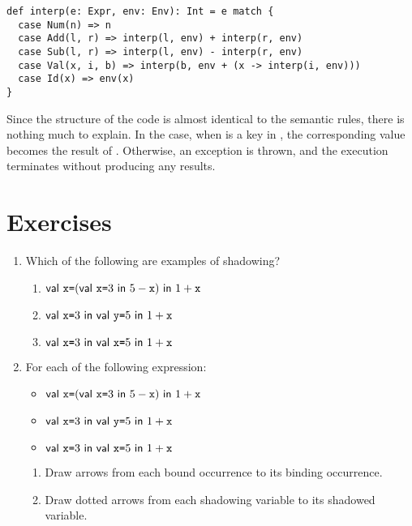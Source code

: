 \begin{verbatim}
def interp(e: Expr, env: Env): Int = e match {
  case Num(n) => n
  case Add(l, r) => interp(l, env) + interp(r, env)
  case Sub(l, r) => interp(l, env) - interp(r, env)
  case Val(x, i, b) => interp(b, env + (x -> interp(i, env)))
  case Id(x) => env(x)
}
\end{verbatim}

Since the structure of the code is almost identical to the semantic rules, there
is nothing much to explain. In the  case, when  is a key in
, the corresponding value becomes the result of .
Otherwise, an exception is thrown, and the execution
terminates without producing any results.

\section{Exercises}

\begin{enumerate}
\item Which of the following are examples of shadowing?
\begin{enumerate}
  \item $\textsf{val}\ \texttt{x}\texttt{=}(\textsf{val}\ \texttt{x}\texttt{=}3\ \textsf{in}\ 5-\texttt{x})\ \textsf{in}\ 1+\texttt{x}$
  \item $\textsf{val}\ \texttt{x}\texttt{=}3\ \textsf{in}\ \textsf{val}\ \texttt{y}\texttt{=}5\ \textsf{in}\ 1+\texttt{x}$
  \item $\textsf{val}\ \texttt{x}\texttt{=}3\ \textsf{in}\ \textsf{val}\ \texttt{x}\texttt{=}5\ \textsf{in}\ 1+\texttt{x}$
\end{enumerate}

\item For each of the following expression:
\begin{itemize}
  \item $\textsf{val}\ \texttt{x}\texttt{=}(\textsf{val}\ \texttt{x}\texttt{=}3\ \textsf{in}\ 5-\texttt{x})\ \textsf{in}\ 1+\texttt{x}$
  \item $\textsf{val}\ \texttt{x}\texttt{=}3\ \textsf{in}\ \textsf{val}\ \texttt{y}\texttt{=}5\ \textsf{in}\ 1+\texttt{x}$
  \item $\textsf{val}\ \texttt{x}\texttt{=}3\ \textsf{in}\ \textsf{val}\ \texttt{x}\texttt{=}5\ \textsf{in}\ 1+\texttt{x}$
\end{itemize}
\begin{enumerate}
  \item Draw arrows from each bound occurrence to its binding occurrence.
  \item Draw dotted arrows from each shadowing variable to its shadowed variable.
\end{enumerate}
\end{enumerate}
